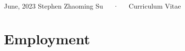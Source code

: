 \documentclass[11pt,a4paper,]{awesome-cv}
\begin{document}
\makecvheader

\makecvfooter
  {June, 2023}
    {Stephen Zhaoming Su~~~·~~~Curriculum Vitae}
  {\thepage}





\hypertarget{employment}{%
\section{Employment}\label{employment}}
\end{document}
